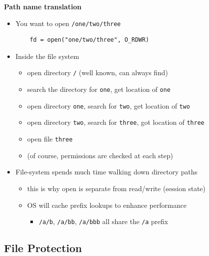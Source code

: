 \documentclass[11pt,a4paper]{article}
\begin{document}
\textbf{Path name translation}
\begin{itemize}
    \item You want to open \texttt{/one/two/three}
        \begin{verbatim}
    fd = open("one/two/three", O_RDWR)
        \end{verbatim}
    \item Inside the file system
        \begin{itemize}
            \item open directory \texttt{/} (well known, can always find)
            \item search the directory for \texttt{one}, get location of \texttt{one}
            \item open directory \texttt{one}, search for \texttt{two}, get location of
                \texttt{two}
            \item open directory \texttt{two}, search for \texttt{three}, got location of
                \texttt{three}
            \item open file \texttt{three}
            \item (of course, permissions are checked at each step)
        \end{itemize}
    \item File-system spends much time walking down directory paths
        \begin{itemize}
            \item this is why open is separate from read/write (session state)
            \item OS will cache prefix lookups to enhance performance
                \begin{itemize}
                    \item \texttt{/a/b}, \texttt{/a/bb}, \texttt{/a/bbb} all share the
                        \texttt{/a} prefix
                \end{itemize}
        \end{itemize}
\end{itemize}

\subsection{File Protection}
\end{document}
